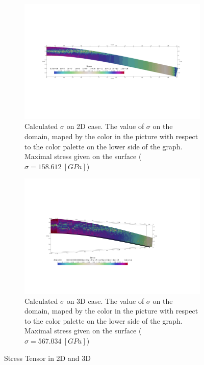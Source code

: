 \documentclass[a4paper,11pt]{article}
\begin{document}
\begin{figure}[h!]
	\begin{subfigure}[b]{0.5\linewidth}
		\centering
		\includegraphics[width=\linewidth]{picture/conference/2dstress}
		\caption{Calculated $\sigma$ on 2D case. The value of $\sigma$ on the domain, maped by the color in the picture with respect to the color palette on the lower side of the graph. Maximal stress given on the surface ($\sigma = 158.612\ [GPa]$)}
		\label{fig:2dstress}
	\end{subfigure}
\quad
	\begin{subfigure}[b]{0.5\linewidth}
		\centering
		\includegraphics[width=\linewidth]{picture/conference/3dstress}
		\caption{Calculated $\sigma$ on 3D case. The value of $\sigma$ on the domain, maped by the color in the picture with respect to the color palette on the lower side of the graph. Maximal stress given on the surface ($\sigma = 567.034\ [GPa]$)}
		\label{fig:3dstress}
	\end{subfigure}
\caption{Stress Tensor in 2D and 3D}
\label{fig:stresstensor}
\end{figure}
\end{document}
